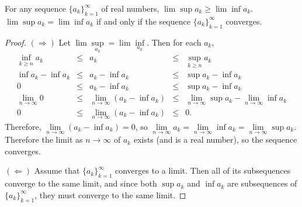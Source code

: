 \begin{pblm}\label{p:limeqliminfeqlimsup}%
	For any sequence $\{a_k\}_{k=1}^\infty$ of real numbers, $\lim\sup a_k 
	\ge \lim\inf a_k$. $\lim\sup a_k = \lim\inf a_k$ if and only if the 
	sequence $\{a_k\}_{k=1}^\infty$ converges. 
\begin{proof}
	$(\Rightarrow)$ Let $\lim\sup\limits_{a_k} = \lim\inf\limits_{a_k}$. Then 
	for each $a_k$, 
	\begin{equation*}
	\begin{array}{rcccl}
		\inf\limits_{k\ge n}a_k & \le & a_k & \le & \sup\limits_{k\ge n} a_k \\
		\inf a_k - \inf a_k & \le & a_k - \inf a_k & \le & \sup a_k - \inf a_k\\
		0 & \le & a_k - \inf a_k & \le & \sup a_k - \inf a_k\\
		\lim\limits_{n\to\infty}0 & \le & \lim\limits_{n\to\infty}(a_k - \inf a_k ) 
		& \le & \lim\limits_{n\to\infty} \sup a_k - \lim\limits_{n\to\infty}\inf a_k\\
		0 & \le & \lim\limits_{n\to\infty}(a_k - \inf a_k) & \le & 0. 
	\end{array}
	\end{equation*}
	Therefore, $\lim\limits_{n\to\infty}(a_k - \inf a_k) = 0$, so 
	$\lim\limits_{n\to\infty}a_k = \lim\limits_{n\to\infty}\inf a_k = 
	\lim\limits_{n\to\infty} \sup a_k$. Therefore the limit  as $n\to\infty$ of $a_k$ 
	exists (and is a real number), so the sequence converges. 

	\noindent$(\Leftarrow)$ Assume that $\{a_k\}_{k=1}^\infty$ converges to a limit. 
	Then all of its subsequences converge to the same limit, and since both $\sup a_k$ 
	and $\inf a_k$ are subsequences of $\{a_k\}_{k=1}^\infty$, they must converge to 
	the same limit. 
\end{proof}
\end{pblm}

